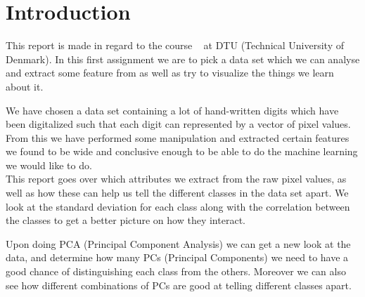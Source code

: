 \chapter{Introduction}
This report is made in regard to the course \textsf{\courseno\ \coursename} at DTU (Technical University of Denmark). In this first assignment we are to pick a data set which we can analyse and extract some feature from as well as try to visualize the things we learn about it.

We have chosen a data set containing a lot of hand-written digits which have been digitalized such that each digit can represented by a vector of pixel values. From this we have performed some manipulation and extracted certain features we found to be wide and conclusive enough to be able to do the machine learning we would like to do. \\

This report goes over which attributes we extract from the raw pixel values, as well as how these can help us tell the different classes in the data set apart. We look at the standard deviation for each class along with the correlation between the classes to get a better picture on how they interact.

Upon doing PCA (Principal Component Analysis) we can get a new look at the data, and determine how many PCs (Principal Components) we need to have a good chance of distinguishing each class from the others. Moreover we can also see how different combinations of PCs are good at telling different classes apart.